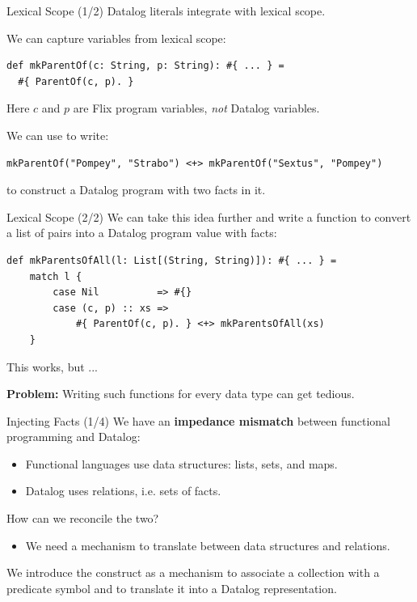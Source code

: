 \begin{frame}[fragile]{Lexical Scope (1/2)}
Datalog literals integrate with lexical scope.

We can capture variables from lexical scope:

\begin{lstlisting}[language=flix, xleftmargin=0.8cm]
def mkParentOf(c: String, p: String): #{ ... } = 
  #{ ParentOf(c, p). }
\end{lstlisting}

Here $c$ and $p$ are Flix program variables, \emph{not} Datalog variables. 

\pause

We can use  to write:

\begin{lstlisting}[language=flix, xleftmargin=0.8cm]
mkParentOf("Pompey", "Strabo") <+> mkParentOf("Sextus", "Pompey")
\end{lstlisting}

to construct a Datalog program with two  facts in it.
\end{frame}

\begin{frame}[fragile]{Lexical Scope (2/2)}
We can take this idea further and write a function to convert a list of pairs
into a Datalog program value with  facts: 

\begin{lstlisting}[language=flix, xleftmargin=0.8cm]
def mkParentsOfAll(l: List[(String, String)]): #{ ... } = 
    match l {
        case Nil          => #{}
        case (c, p) :: xs => 
            #{ ParentOf(c, p). } <+> mkParentsOfAll(xs)
    }
\end{lstlisting}

\pause

This works, but ...

\textbf{Problem:} Writing such functions for every data type can get tedious.
\end{frame}

\begin{frame}[fragile]{Injecting Facts (1/4)}
We have an \textbf{impedance mismatch} between functional programming and Datalog:

\begin{itemize}
    \item Functional languages use data structures: lists, sets, and maps.
    \item Datalog uses relations, i.e. sets of facts.
\end{itemize}

\pause

How can we reconcile the two? 

\begin{itemize}
    \item We need a mechanism to translate between data structures and
    relations. 
\end{itemize}

We introduce the  construct as a mechanism to associate a collection
with a predicate symbol and to translate it into a Datalog representation.
\end{frame}

